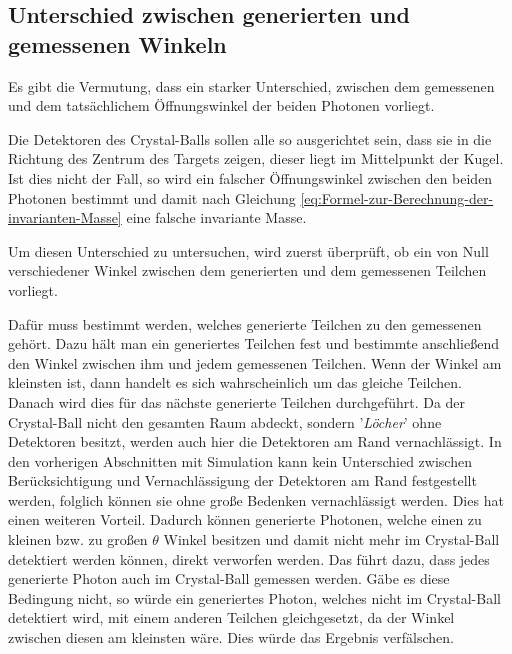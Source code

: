 \documentclass[a4paper,11pt,oneside,final,german,openbib,pdftex]{scrbook}
\begin{document}
{%




\subsection{Unterschied zwischen generierten und gemessenen Winkeln}
\label{sec:Unterschied-tatsaechlicher-gemessener-Winkel}

Es gibt die Vermutung, dass ein starker Unterschied, zwischen dem gemessenen und dem tatsächlichem Öffnungswinkel der beiden Photonen vorliegt.

Die Detektoren des Crystal-Balls sollen alle so ausgerichtet sein, dass sie in die Richtung des Zentrum des Targets zeigen, dieser liegt im Mittelpunkt der Kugel. Ist dies nicht der Fall, so wird ein falscher Öffnungswinkel zwischen den beiden Photonen bestimmt und damit nach Gleichung \ref{eq:Formel-zur-Berechnung-der-invarianten-Masse} eine falsche invariante Masse.

Um diesen Unterschied zu untersuchen, wird zuerst überprüft, ob ein von Null verschiedener Winkel zwischen dem generierten und dem gemessenen Teilchen vorliegt.

Dafür muss bestimmt werden, welches generierte Teilchen zu den gemessenen gehört. Dazu h\"alt man ein generiertes Teilchen fest und bestimmte anschließend den Winkel zwischen ihm und jedem gemessenen Teilchen. Wenn der Winkel am kleinsten ist, dann handelt es sich wahrscheinlich um das gleiche Teilchen. Danach wird dies für das nächste generierte Teilchen durchgeführt. Da der Crystal-Ball nicht den gesamten Raum abdeckt, sondern '\textit{Löcher}' ohne Detektoren besitzt, werden auch hier die Detektoren am Rand vernachlässigt. In den vorherigen Abschnitten mit Simulation kann kein Unterschied zwischen Berücksichtigung und Vernachlässigung der Detektoren am Rand festgestellt werden, folglich k\"onnen sie ohne große Bedenken vernachlässigt werden. Dies hat einen weiteren Vorteil. Dadurch k\"onnen generierte Photonen, welche einen zu kleinen bzw. zu großen $\theta$ Winkel besitzen und damit nicht mehr im Crystal-Ball detektiert werden k\"onnen, direkt verworfen werden. Das führt dazu, dass jedes generierte Photon auch im Crystal-Ball gemessen werden. Gäbe es diese Bedingung nicht, so würde ein generiertes Photon, welches nicht im Crystal-Ball detektiert wird, mit einem anderen Teilchen gleichgesetzt, da der Winkel zwischen diesen am kleinsten wäre. Dies würde das Ergebnis verfälschen. 

}
\end{document}
